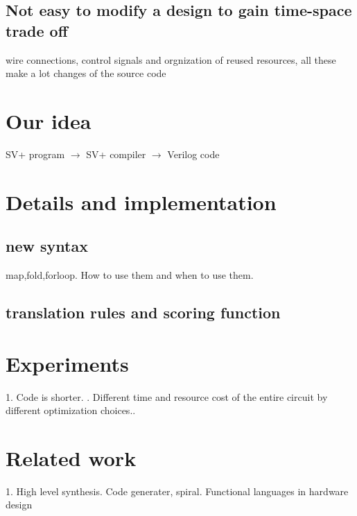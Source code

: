 \documentclass[11pt]{article} %
\begin{document}
\subsection{Not easy to modify a design to gain time-space trade off}
wire connections, control signals and orgnization of reused resources, all these make a lot changes of the source code
\section{Our idea}
SV+ program $\rightarrow$ SV+ compiler $\rightarrow$ Verilog code
\section{Details and implementation}
\subsection{new syntax}
map,fold,forloop. How to use them and when to use them.
\subsection{translation rules and scoring function}
\section{Experiments}
1. Code is shorter. . Different time and resource cost of the entire circuit by different optimization  choices.. 
\section{Related work}
1. High level synthesis. Code generater, spiral. Functional languages in hardware design
\end{document}
